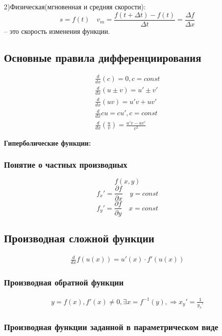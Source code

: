 \documentclass[a4paper, 12pt]{article}
\begin{document}
       
2)Физическая(мгновенная и средняя скорости):\\
\[
  s = f(t) \quad v_m = \frac{f(t + \Delta t) - f(t)}{\Delta t} = \frac{\Delta f}{\Delta x}
\]
-- это скорость изменения функции.

\subsection{Основные правила дифференциирования}

\begin{align}
  \frac{d}{dx} (c) = 0, c = const\\
  \frac{d}{dx} (u \pm v) = u' \pm v'\\
  \frac{d}{dx} (uv) = u'v+u v'\\
  \frac{d}{dx} cu = c u',c=const\\
  \frac{d}{dx} \left(\frac{u}{v}\right) = \frac{u' v - uv'}{v^2}
\end{align}

\textbf{Гиперболические функции:}\\

\subsubsection*{Понятие о частных производных}
\[
  f(x,y)
\]
\[
  f_x' = \frac{\partial f}{\partial x} \quad y=const 
\]
\[
  f_y' = \frac{\partial f}{\partial y} \quad x=const
\]

\subsection{Производная сложной функции}

\begin{align}
  \frac{d}{dx} f(u(x)) = u'(x) \cdot f'(u(x)) 
\end{align}

\subsubsection*{Производная обратной функции}

\begin{align}
  y = f(x),f'(x)\neq 0,\exists x=f^{-1}(y),\Rightarrow x_y' = \frac{1}{y_x'}
\end{align}

\subsubsection{Производная функции заданной в параметрическом виде}
\end{document}
